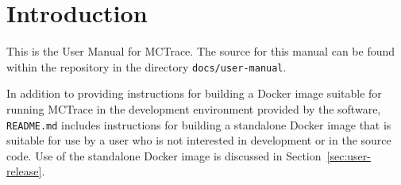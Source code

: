 \section{Introduction}
\label{sec:introduction}

This is the User Manual for MCTrace. The source for this manual can be
found within the repository in the directory \texttt{docs/user-manual}.

In addition to providing instructions for building a Docker image
suitable for running MCTrace in the development environment provided by
the software, \texttt{README.md} includes instructions for building a
standalone Docker image that is suitable for use by a user who is not
interested in development or in the source code. Use of the standalone
Docker image is discussed in Section~\ref{sec:user-release}.




